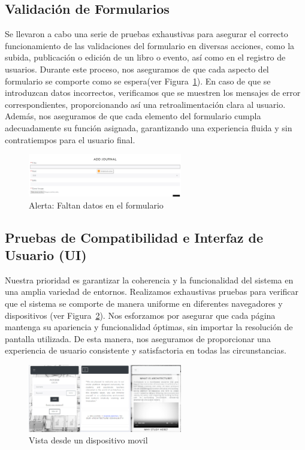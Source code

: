 \documentclass[a4paper, 12pt]{book}
\begin{document}
\subsection{Validación de Formularios}
\label{sec:validacion}
Se llevaron a cabo una serie de pruebas exhaustivas para asegurar el correcto funcionamiento de las validaciones del formulario 
en diversas acciones, como la subida, publicación o edición de un libro o evento, así como en el registro de usuarios.
Durante este proceso, nos aseguramos de que cada aspecto del formulario se comporte como se espera(ver Figura~\ref{fig:form}). En caso de que se introduzcan 
datos incorrectos, verificamos que se muestren los mensajes de error correspondientes, proporcionando así una retroalimentación 
clara al usuario. Además, nos aseguramos de que cada elemento del formulario cumpla adecuadamente su función asignada, garantizando 
una experiencia fluida y sin contratiempos para el usuario final.
\begin{figure}
  \centering
  \includegraphics[width=0.6\textwidth]{img/formulario.png}
  \caption{Alerta: Faltan datos en el formulario}
  \label{fig:form}
\end{figure}
\subsection{Pruebas de Compatibilidad e Interfaz de Usuario (UI)}
\label{sec:compatibilidad}
Nuestra prioridad es garantizar la coherencia y la funcionalidad del sistema en una amplia variedad de entornos. Realizamos exhaustivas 
pruebas para verificar que el sistema se comporte de manera uniforme en diferentes navegadores y dispositivos (ver Figura~\ref{fig:movil}). 
Nos esforzamos por asegurar que cada página mantenga su apariencia y funcionalidad óptimas, sin importar la resolución de pantalla utilizada. De esta 
manera, nos aseguramos de proporcionar una experiencia de usuario consistente y satisfactoria en todas las circunstancias.
\begin{figure}
  \centering
  \includegraphics[width=0.6\textwidth]{img/vistamovil.png}
  \caption{Vista desde un dispositivo movil}
  \label{fig:movil}
\end{figure}
\end{document}

